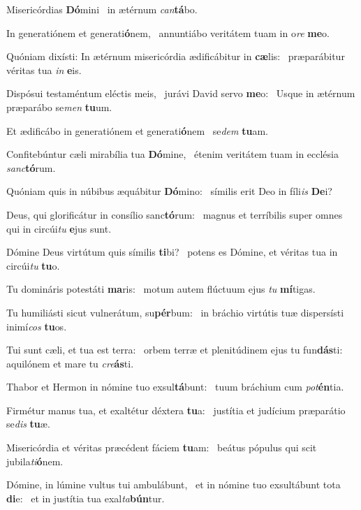 \item Misericórdias \textbf{Dó}mini~\psstar{} in ætérnum \textit{can}\textbf{tá}bo.
\item In generatiónem et generati\textbf{ó}nem,~\psstar{} annuntiábo veritátem tuam in o\textit{re} \textbf{me}o.
\item Quóniam dixísti: In ætérnum misericórdia ædificábitur in \textbf{cæ}lis:~\psstar{} præparábitur véritas tua \textit{in} \textbf{e}is.
\item Dispósui testaméntum eléctis meis,~\pscross{} jurávi David servo \textbf{me}o:~\psstar{} Usque in ætérnum præparábo se\textit{men} \textbf{tu}um.
\item Et ædificábo in generatiónem et generati\textbf{ó}nem~\psstar{} se\textit{dem} \textbf{tu}am.
\item Confitebúntur cæli mirabília tua \textbf{Dó}mine,~\psstar{} étenim veritátem tuam in ecclésia \textit{sanc}\textbf{tó}rum.
\item Quóniam quis in núbibus æquábitur \textbf{Dó}mino:~\psstar{} símilis erit Deo in fíli\textit{is} \textbf{De}i?
\item Deus, qui glorificátur in consílio sanc\textbf{tó}rum:~\psstar{} magnus et terríbilis super omnes qui in circúi\textit{tu} \textbf{e}jus sunt.
\item Dómine Deus virtútum quis símilis \textbf{ti}bi?~\psstar{} potens es Dómine, et véritas tua in circúi\textit{tu} \textbf{tu}o.
\item Tu domináris potestáti \textbf{ma}ris:~\psstar{} motum autem flúctuum ejus \textit{tu} \textbf{mí}tigas.
\item Tu humiliásti sicut vulnerá\-tum, su\textbf{pér}bum:~\psstar{} in bráchio virtútis tuæ dispersísti inimí\textit{cos} \textbf{tu}os.
\item Tui sunt cæli, et tua est terra:~\pscross{} orbem terræ et plenitúdinem ejus tu fun\textbf{dás}ti:~\psstar{} aquilónem et mare tu \textit{cre}\textbf{ás}ti.
\item Thabor et Hermon in nómine tuo exsul\textbf{tá}bunt:~\psstar{} tuum bráchium cum \textit{pot}\textbf{én}tia.
\item Firmétur manus tua, et exaltétur déxtera \textbf{tu}a:~\psstar{} justítia et judícium præparátio se\textit{dis} \textbf{tu}æ.
\item Misericórdia et véritas præcédent fáciem \textbf{tu}am:~\psstar{} beátus pópulus qui scit jubila\textit{ti}\textbf{ó}nem.
\item Dómine, in lúmine vultus tui ambulábunt,~\pscross{} et in nómine tuo exsultábunt tota \textbf{di}e:~\psstar{} et in justítia tua exal\textit{ta}\textbf{bún}tur.
